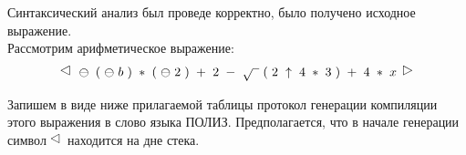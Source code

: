 \documentclass[a4paper, 14pt]{extarticle}
\begin{document}
Синтаксический анализ был проведе корректно, было получено исходное выражение.\\
Рассмотрим арифметическое выражение:
\begin{equation}
    \rotatebox{90}{\(\triangle\)} \hspace{3pt} \ominus \hspace{3pt} ( \hspace{3pt} \ominus \hspace{3pt} b \hspace{3pt} ) \hspace{3pt} * \hspace{3pt} ( \hspace{3pt} \ominus \hspace{3pt} 2 \hspace{3pt} ) \hspace{3pt} + \hspace{3pt} 2 \hspace{3pt} - \hspace{3pt} \sqrt{\hphantom{1}} \hspace{3pt} ( \hspace{3pt} 2 \hspace{3pt} \uparrow \hspace{3pt} 4 \hspace{3pt} * \hspace{3pt} 3 \hspace{3pt} ) \hspace{3pt} + \hspace{3pt} 4 \hspace{3pt} * \hspace{3pt} x \hspace{3pt} \reflectbox{\rotatebox{90}{\(\triangle\)}}
\end{equation}

Запишем в виде ниже прилагаемой таблицы протокол генерации компиляции этого
выражения в слово языка ПОЛИЗ. Предполагается, что в начале генерации символ $\rotatebox{90}{\(\triangle\)}$
находится на дне стека.

\newpage
\end{document}

